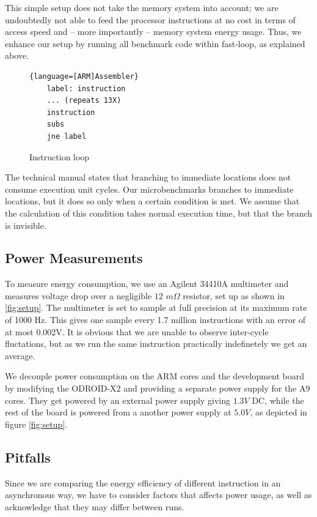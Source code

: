 This simple setup does not take the memory system into account; we are
undoubtedly not able to feed the processor instructions at no cost in terms of
access speed and -- more importantly -- memory system energy usage. Thus, we
enhance our setup by running all benchmark code within fast-loop, as explained
above.


\begin{figure}
    \begin{lstlisting}{language=[ARM]Assembler}
    label: instruction
    ... (repeats 13X)
    instruction
    subs
    jne label
    \end{lstlisting}
    \caption{Instruction loop}
    \label{list:inst_loop}
\end{figure}

The technical manual states that branching to immediate locations does not
consume execution unit cycles. Our microbenchmarks branches to immediate
locations, but it does so only when a certain condition is met. We assume that
the calculation of this condition takes normal execution time, but that the
branch is invisible.


\subsection{Power Measurements}
To measure energy consumption, we use an Agilent 34410A
multimeter\cite{agilent34410a} and measures voltage drop over a negligible $12$
$m\Omega$ resistor, set up as shown in \autoref{fig:setup}. The multimeter is
set to sample at full precision at its maximum rate of 1000 Hz. This gives one
sample every 1.7 million instructions with an error of at most 0.002V. It is
obvious that we are unable to observe inter-cycle fluctations, but as we run the
same instruction practically indefinetely we get an average.

We decouple power consumption on the ARM cores and the development board by
modifying the ODROID-X2 and providing a separate power supply for the A9 cores.
They get powered by an external power supply giving $1.3V$ DC, while the rest of
the board is powered from a another power supply at $5.0V$, as depicted in
figure \ref{fig:setup}.

\subsection{Pitfalls}
Since we are comparing the energy efficiency of different instruction in an
asynchronous way, we have to consider factors that affects power usage, as well
as acknowledge that they may differ between runs.

